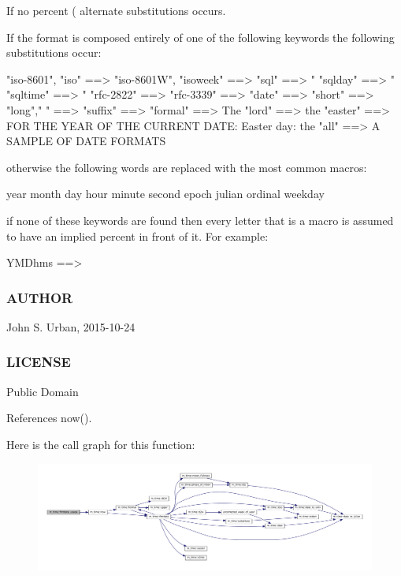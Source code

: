 \begin{DoxyVerb}
If no percent (%
alternate substitutions occurs.

If the format is composed entirely of one of the following
keywords the following substitutions occur:

  "iso-8601",
  "iso"        ==> %
  "iso-8601W",
  "isoweek"    ==> %
  "sql"        ==> "%
  "sqlday"     ==> "%
  "sqltime"    ==> "%
  "rfc-2822"   ==> %
  "rfc-3339"   ==> %
  "date"       ==> %
  "short"      ==> %
  "long"," "   ==> %
  "suffix"     ==> %
  "formal"     ==> The %
  "lord"       ==> the %
  "easter"     ==> FOR THE YEAR OF THE CURRENT DATE:
                   Easter day: the %
  "all"        ==> A SAMPLE OF DATE FORMATS

otherwise the following words are replaced with the most
common macros:

   year     %
   month    %
   day      %
   hour     %
   minute   %
   second   %
   epoch    %
   julian   %
   ordinal  %
   weekday  %

if none of these keywords are found then every letter that
is a macro is assumed to have an implied percent in front
of it. For example:

   YMDhms ==> %
\end{DoxyVerb}
 \subsubsection*{A\+U\+T\+H\+OR}

John S. Urban, 2015-\/10-\/24 \subsubsection*{L\+I\+C\+E\+N\+SE}

Public Domain 

References now().

Here is the call graph for this function\+:\nopagebreak
\begin{figure}[H]
\begin{center}
\leavevmode
\includegraphics[width=350pt]{namespacem__time_a914927f70fb9495af1be2e484b967111_cgraph}
\end{center}
\end{figure}
\mbox{\label{namespacem__time_a8d843c997d304f40fd5aed820c5a7473}} 

